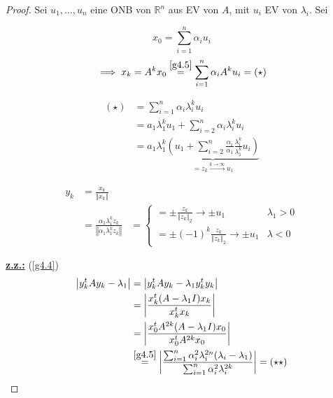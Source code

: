 \documentclass{book}
\def\R{\mathbb{R}}
\begin{document}
            \begin{proof}
                Sei $u_1,\dots,u_n$ eine ONB von $\R^n$ aus EV von $A$, mit $u_i$ EV von $\lambda_i$. 
                Sei

                \begin{equation}\label{g4.5}
                    x_0=\sum_{i=1}^n\alpha_i u_i
                \end{equation}
                \begin{equation*}
                    \implies x_k=A^kx_0\stackrel{\ref{g4.5}}{=}\sum_{i=1}^n\alpha_i A^k u_i = (\star)
                \end{equation*}

                \begin{align*}
                    (\star) &= \sum_{i=1}^n\alpha_i \lambda_i^k u_i\\
                    &= a_1\lambda_1^ku_1 + \sum_{i=2}^n\alpha_i \lambda_i^k u_i\\
                    &= a_1\lambda_1^k \underbrace{\left(u_1+\sum_{i=2}^n\frac{\alpha_i}{\alpha_1} \frac{\lambda_i^k}{\lambda_1^k} u_i\right)}_{=z_k\stackrel{k\to\infty}{\to} u_1}
                \end{align*}

                \begin{align*}
                    y_k&=\frac{x_k}{\left\Vert x_k \right\Vert}\\
                    &=\frac{\alpha_1\lambda_1^kz_k}{\left\Vert \alpha_1\lambda_1^kz_k \right\Vert}
                    &=\begin{cases}
                        =\pm \frac{z_k}{\left\Vert z_k \right\Vert_2}\to \pm u_1 & \lambda_1 >0 \\ 
                        =\pm(-1)^k\frac{z_k}{\left\Vert z_k \right\Vert_2}\to \pm u_1 & \lambda < 0
                    \end{cases}
                \end{align*}

                \underline{\textbf{z.z.:}} (\ref{g4.4})
                \begin{align*}
                    \left\vert y_k^tAy_k-\lambda_1 \right\vert &= \left\vert y_k^tAy_k-\lambda_1y_k^ty_k \right\vert\\ 
                    &= \left\vert \frac{x_k^t(A-\lambda_1I)x_k}{x_k^t x_k} \right\vert \\
                    &= \left\vert \frac{x_0^tA^{2k}(A-\lambda_1 I)x_0}{x_0^t A^{2k}x_0} \right\vert\\ 
                    &\stackrel{\ref{g4.5}}{=}\left\vert \frac{\sum_{i=1}^n \alpha_i^2\lambda_i^{2n}(\lambda_i-\lambda_1)}{\sum_{i=1}^n\alpha_i^2\lambda_i^{2k}} \right\vert = (\star \star)
                \end{align*}


\end{proof}
\end{document}
